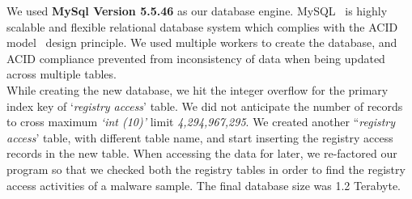 We used \textbf{MySql Version 5.5.46} as our database engine. MySQL~\cite[]{mysql} is highly scalable and flexible relational database system which complies with the ACID model~\cite[]{acid} design principle.
We used multiple workers to create the database, and ACID compliance prevented from inconsistency of data when being updated across multiple tables.\\

While creating the new database, we hit the integer overflow for the primary index key of `\emph{registry access}' table.
We did not anticipate the number of records to cross maximum \emph{`int (10)'} limit \emph{4,294,967,295}.
We created another ``\emph{registry access}' table, with different table name, and start inserting the registry access records in the new table.
When accessing the data for later, we re-factored our program so that we checked both the registry tables in order to find the registry access activities of a malware sample.
The final database size was 1.2 Terabyte.\\

